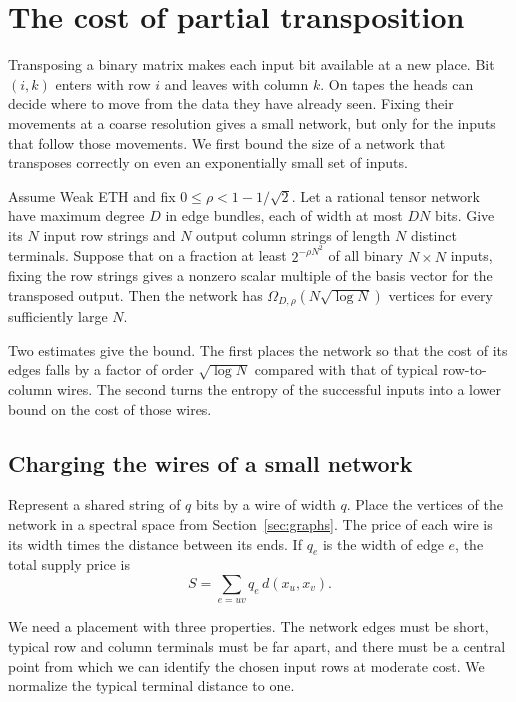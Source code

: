 \section{The cost of partial transposition}\label{sec:partial}

Transposing a binary matrix makes each input bit available at a new
place. Bit $(i,k)$ enters with row $i$ and leaves with column $k$.
On tapes the heads can decide where to move from the data they have
already seen. Fixing their movements at a coarse resolution gives a
small network, but only for the inputs that follow those movements.
We first bound the size of a network that transposes correctly on
even an exponentially small set of inputs.

\begin{theorem}\label{thm:table}
Assume Weak ETH and fix $0\le\rho<1-1/\sqrt2$. Let a rational tensor
network have maximum degree $D$ in edge bundles, each of width at most
$DN$ bits. Give its $N$ input row strings and $N$ output column strings
of length $N$ distinct terminals. Suppose that on a fraction at least
$2^{-\rho N^2}$ of all binary $N\times N$ inputs, fixing the row strings
gives a nonzero scalar multiple of the basis vector for the transposed
output. Then the network has $\Omega_{D,\rho}(N\sqrt{\log N})$ vertices
for every sufficiently large $N$.
\end{theorem}

Two estimates give the bound. The first places the network so that the
cost of its edges falls by a factor of order $\sqrt{\log N}$ compared
with that of typical row-to-column wires. The second turns the entropy
of the successful inputs into a lower bound on the cost of those wires.

\subsection{Charging the wires of a small network}

Represent a shared string of $q$ bits by a wire of width $q$. Place the
vertices of the network in a spectral space from Section~\ref{sec:graphs}.
The price of each wire is its width times the distance between its ends.
If $q_e$ is the width of edge $e$, the total supply price is
\begin{equation}\label{eq:supply-cost}
 S=\sum_{e=uv}q_e\,d(x_u,x_v).
\end{equation}

We need a placement with three properties. The network edges must be
short, typical row and column terminals must be far apart, and there
must be a central point from which we can identify the chosen input
rows at moderate cost. We normalize the typical terminal distance to one.

